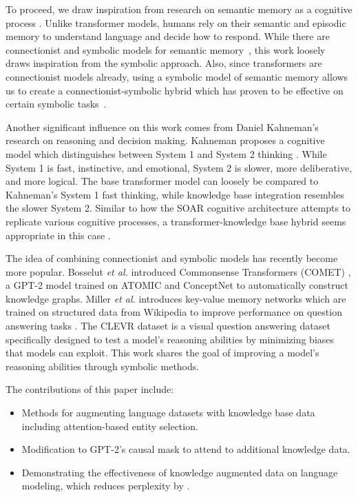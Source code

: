 \documentclass[phd,electronic,oneside,twosidetoc,letterpaper,chaptercenter,parttop,lof]{byumsphd}
\begin{document}
To proceed, we draw inspiration from research on semantic memory as a cognitive process \cite{tulving1972episodic}. 
Unlike transformer models, humans rely on their semantic and episodic memory to understand language and decide how to respond.
While there are connectionist and symbolic models for semantic memory~\cite{jones2015models}, this work loosely draws inspiration from the symbolic approach.
Also, since transformers are connectionist models already, using a symbolic model of semantic memory allows us to create a connectionist-symbolic hybrid which has proven to be effective on certain symbolic tasks~\cite{mao2019neuro}.

Another significant influence on this work comes from Daniel Kahneman's research on reasoning and decision making.
Kahneman proposes a cognitive model which distinguishes between System 1 and System 2 thinking \cite{kahneman2011thinking}. While System 1 is fast, instinctive, and emotional, System 2 is slower, more deliberative, and more logical. 
The base transformer model can loosely be compared to Kahneman's System 1 fast thinking, while knowledge base integration resembles the slower System 2.
Similar to how the SOAR cognitive architecture attempts to replicate various cognitive processes, a transformer-knowledge base hybrid seems appropriate in this case \cite{laird2012soar}.

The idea of combining connectionist and symbolic models has recently become more popular. 
Bosselut \textit{et al.} introduced Commonsense Transformers (COMET) \cite{bosselut2019comet}, a GPT-2 model trained on ATOMIC \cite{sap2019atomic} and ConceptNet \cite{liu2004conceptnet} to automatically construct knowledge graphs.
Miller \textit{et al.} introduces key-value memory networks which are trained on structured data from Wikipedia to improve performance on question answering tasks \cite{miller2016key}.
The CLEVR dataset \cite{johnson2017clevr} is a visual question answering dataset specifically designed to test a model's reasoning abilities by minimizing biases that models can exploit.
This work shares the goal of improving a model's reasoning abilities through symbolic methods.

The contributions of this paper include:
\begin{itemize}
    \item Methods for augmenting language datasets with knowledge base data including attention-based entity selection.
    \item Modification to GPT-2's causal mask to attend to additional knowledge data.
    \item Demonstrating the effectiveness of knowledge augmented data on language modeling, which reduces perplexity by \LMLossPercentageDecrease.
\end{itemize}
\end{document}
